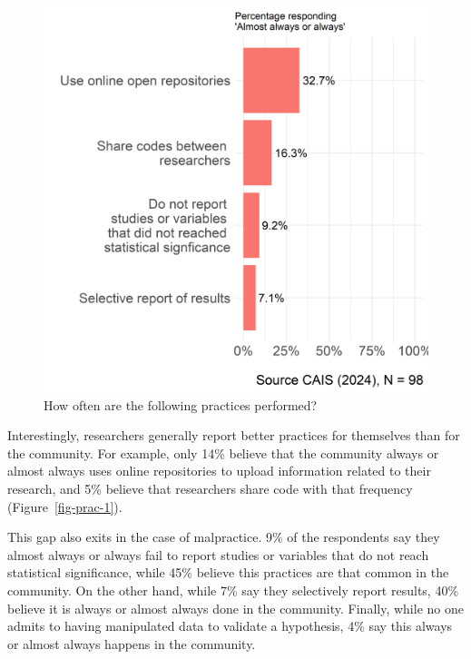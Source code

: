 \documentclass[
  letterpaper,
]{article}
\begin{document}
\begin{figure}
\begin{minipage}{0.50\linewidth}
{\includegraphics{paper_files/figure-pdf/fig-prac-2.png}

}


\end{minipage}%

\caption{\label{fig-prac}How often are the following practices
performed?}

\end{figure}%

Interestingly, researchers generally report better practices for
themselves than for the community. For example, only 14\% believe that
the community always or almost always uses online repositories to upload
information related to their research, and 5\% believe that researchers
share code with that frequency (Figure~\ref{fig-prac-1}).

This gap also exits in the case of malpractice. 9\% of the respondents
say they almost always or always fail to report studies or variables
that do not reach statistical significance, while 45\% believe this
practices are that common in the community. On the other hand, while 7\%
say they selectively report results, 40\% believe it is always or almost
always done in the community. Finally, while no one admits to having
manipulated data to validate a hypothesis, 4\% say this always or almost
always happens in the community.
\end{document}

